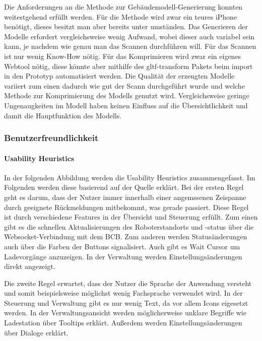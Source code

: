 Die Anforderungen an die Methode zur Gebäudemodell-Generierung konnten weitestgehend erfüllt werden. Für die Methode wird zwar ein teures iPhone benötigt, dieses besitzt man aber bereits unter umständen. Das Generieren der Modelle erfordert vergleichsweise wenig Aufwand, wobei dieser auch variabel sein kann, je nachdem wie genau man das Scannen durchführen will. Für das Scannen ist nur wenig Know-How nötig. Für das Komprimieren wird zwar ein eigenes Webtool nötig, diese könnte aber mithilfe des gltf-transform Pakets beim import in den Prototyp automatisiert werden.
Die Qualität der erzeugten Modelle variiert zum einen dadurch wie gut der Scann durchgeführt wurde und welche Methode zur Komprimierung des Modells genutzt wird. Vergleichsweise geringe Ungenaugkeiten im Modell haben keinen Einfluss auf die Übersichtlichkeit und damit die Hauptfunktion des Modells. 

\subsubsection{Benutzerfreundlichkeit}

\paragraph{Usability Heuristics}
In der folgenden Abbildung werden die Usability Heuristics zusammengefasst. Im Folgenden werden diese basierend auf der Quelle erklärt.
Bei der ersten Regel geht es darum, dass der Nutzer immer innerhalb einer angemssenen Zeispanne durch geeignete Rückmeldungen mitbekommt, was gerade passiert. Diese Regel ist durch verschiedene Features in der Übersicht und Steuerung erfüllt. Zum einen gibt es die schnellen Aktualisierungen des Roboterstandorts und -status über die \gls{Websocket}-Verbindung mit dem \ac{BCB}. Zum anderen werden Statusänderungen auch über die Farben der Buttons signalisiert. Auch gibt es Wait Cursor um Ladevorgänge anzuzeigen. In der Verwaltung werden Einstellungsänderungen direkt angezeigt.

Die zweite Regel erwartet, dass der Nutzer die Sprache der Anwendung versteht und somit beispielsweise möglichst wenig Fachsprache verwendet wird. In der Steuerung und Verwaltung gibt es nur wenig Text, da vor allem Icons eigesetzt werden. In der Verwaltungsansicht werden möglicherweise unklare Begriffe wie Ladestation über Tooltips erklärt. Außerdem werden Einstellungsänderungen über Dialoge erklärt.

